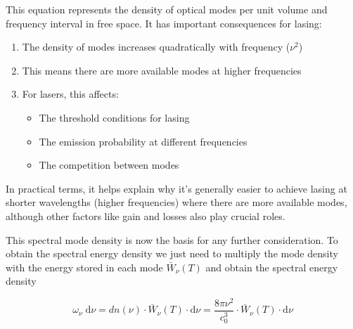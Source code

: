 \documentclass[
  a4paper,
]{book}
\providecommand{\tightlist}{%
  \setlength{\itemsep}{0pt}\setlength{\parskip}{0pt}}
\begin{document}
\begin{tcolorbox}[enhanced jigsaw, coltitle=black, title=\textcolor{quarto-callout-note-color}{\faInfo}\hspace{0.5em}{Density of optical modes per unit volume}, colframe=quarto-callout-note-color-frame, toprule=.15mm, opacitybacktitle=0.6, left=2mm, opacityback=0, breakable, toptitle=1mm, bottomtitle=1mm, leftrule=.75mm, arc=.35mm, titlerule=0mm, colbacktitle=quarto-callout-note-color!10!white, rightrule=.15mm, bottomrule=.15mm, colback=white]

This equation represents the density of optical modes per unit volume
and frequency interval in free space. It has important consequences for
lasing:

\begin{enumerate}
\def\labelenumi{\arabic{enumi}.}
\tightlist
\item
  The density of modes increases quadratically with frequency
  (\(\nu^2\))
\item
  This means there are more available modes at higher frequencies
\item
  For lasers, this affects:

  \begin{itemize}
  \tightlist
  \item
    The threshold conditions for lasing
  \item
    The emission probability at different frequencies
  \item
    The competition between modes
  \end{itemize}
\end{enumerate}

In practical terms, it helps explain why it's generally easier to
achieve lasing at shorter wavelengths (higher frequencies) where there
are more available modes, although other factors like gain and losses
also play crucial roles.

\end{tcolorbox}

This spectral mode density is now the basis for any further
consideration. To obtain the spectral energy density we just need to
multiply the mode density with the energy stored in each mode
\(\bar{W}_{\nu} \left( T \right)\) and obtain the spectral energy
density

\[
\omega_{\nu} \; \mathrm{d} \nu = dn \left( \nu \right) \cdot \bar{W}_{\nu} \left( T \right) \cdot \mathrm{d}\nu = \frac{8 \pi \nu^2}{c_0^3} \cdot \bar{W}_{\nu} \left( T \right) \cdot \mathrm{d}\nu
\]
\end{document}
